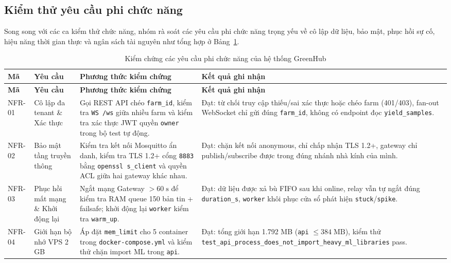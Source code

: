 \subsection{Kiểm thử yêu cầu phi chức năng}
\label{subsec:c4-nfr-tests}

Song song với các ca kiểm thử chức năng, nhóm rà soát các yêu cầu phi chức năng trọng yếu về cô lập dữ liệu, bảo mật, phục hồi sự cố, hiệu năng thời gian thực và ngân sách tài nguyên như tổng hợp ở Bảng~\ref{tab:greenhub-nfr}.

\begingroup
\scriptsize
\sloppy
\setlength{\tabcolsep}{3pt}
\renewcommand{\arraystretch}{1.1}
\begin{longtable}{|>{\centering\arraybackslash}p{}|>{\raggedright\arraybackslash}p{}|>{\raggedright\arraybackslash}p{}|>{\raggedright\arraybackslash}p{}|}
\caption{Kiểm chứng các yêu cầu phi chức năng của hệ thống GreenHub}\label{tab:greenhub-nfr}\\
\hline
\textbf{Mã} & \textbf{Yêu cầu} & \textbf{Phương thức kiểm chứng} & \textbf{Kết quả ghi nhận} \\
\hline
\endfirsthead
\hline
\textbf{Mã} & \textbf{Yêu cầu} & \textbf{Phương thức kiểm chứng} & \textbf{Kết quả ghi nhận} \\
\hline
\endhead
NFR-01 & Cô lập đa tenant \& Xác thực & Gọi REST API chéo \texttt{farm\_id}, kiểm tra \texttt{WS /ws} giữa nhiều farm và kiểm tra xác thực JWT quyền \texttt{owner} trong bộ test tự động. & Đạt: từ chối truy cập thiếu/sai xác thực hoặc chéo farm (401/403), fan-out WebSocket chỉ gửi đúng \texttt{farm\_id}, không có endpoint đọc \texttt{yield\_samples}. \\ \hline
NFR-02 & Bảo mật tầng truyền thông & Kiểm tra kết nối Mosquitto ẩn danh, kiểm tra TLS 1.2+ cổng \texttt{8883} bằng \texttt{openssl s\_client} và quyền ACL giữa hai gateway khác nhau. & Đạt: chặn kết nối anonymous, chỉ chấp nhận TLS 1.2+, gateway chỉ publish/subscribe được trong đúng nhánh nhà kính của mình. \\ \hline
NFR-03 & Phục hồi mất mạng \& Khởi động lại & Ngắt mạng Gateway \(> 60\;\text{s}\) để kiểm tra RAM queue 150 bản tin + failsafe; khởi động lại \texttt{worker} kiểm tra \texttt{warm\_up}. & Đạt: dữ liệu được xả bù FIFO sau khi online, relay vẫn tự ngắt đúng \texttt{duration\_s}, \texttt{worker} khôi phục cửa sổ phát hiện \texttt{stuck}/\texttt{spike}. \\ \hline
NFR-04 & Giới hạn bộ nhớ VPS 2 GB & Áp đặt \texttt{mem\_limit} cho 5 container trong \texttt{docker-compose.yml} và kiểm thử chặn import ML trong \texttt{api}. & Đạt: tổng giới hạn 1.792 MB (\texttt{api} \(\le 384\;\text{MB}\)), kiểm thử \texttt{test\_api\_process\_does\_not\_import\_heavy\_ml\_libraries} pass. \\ \hline

\end{longtable}
